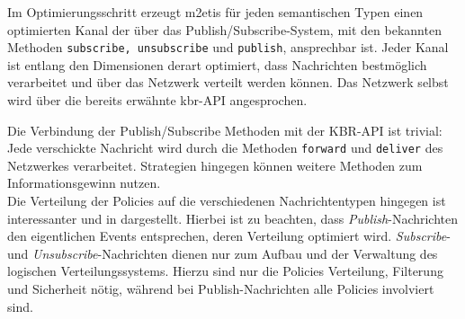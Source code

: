 Im Optimierungsschritt erzeugt \ac{m2etis} für jeden semantischen Typen einen optimierten Kanal der über das Publish/Subscribe-System, mit den bekannten Methoden \texttt{subscribe, unsubscribe} und \texttt{publish}, ansprechbar ist. Jeder Kanal ist entlang den Dimensionen derart optimiert, dass Nachrichten bestmöglich verarbeitet und über das Netzwerk verteilt werden können. Das Netzwerk selbst wird über die bereits erwähnte \ac{kbr}-API angesprochen. 

Die Verbindung der Publish/Subscribe Methoden mit der KBR-API ist trivial: Jede verschickte Nachricht wird durch die Methoden \texttt{forward} und \texttt{deliver} des Netzwerkes verarbeitet. Strategien hingegen können weitere Methoden zum Informationsgewinn nutzen.\\
Die Verteilung der Policies auf die verschiedenen Nachrichtentypen hingegen ist interessanter und in  dargestellt. Hierbei ist zu beachten, dass \emph{Publish}-Nachrichten den eigentlichen Events entsprechen, deren Verteilung optimiert wird. \emph{Subscribe}- und \emph{Unsubscribe}-Nachrichten dienen nur zum Aufbau und der Verwaltung des logischen Verteilungssystems. Hierzu sind nur die Policies Verteilung, Filterung und Sicherheit nötig, während bei Publish-Nachrichten alle Policies involviert sind.

\begin{table}[!h]
\caption{Verbindungsmatrix}
\label{tab:verbindungsmatrix}
\end{table}

